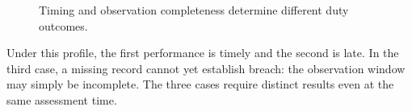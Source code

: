 \begin{figure}[H]
\centering
{}
\caption{Timing and observation completeness determine different duty outcomes.}\label{fig:teach-P-03b-event-contract-00}
\end{figure}

Under this profile, the first performance is timely and the second is late. In the third case, a missing record cannot yet establish breach: the observation window may simply be incomplete. The three cases require distinct results even at the same assessment time.

